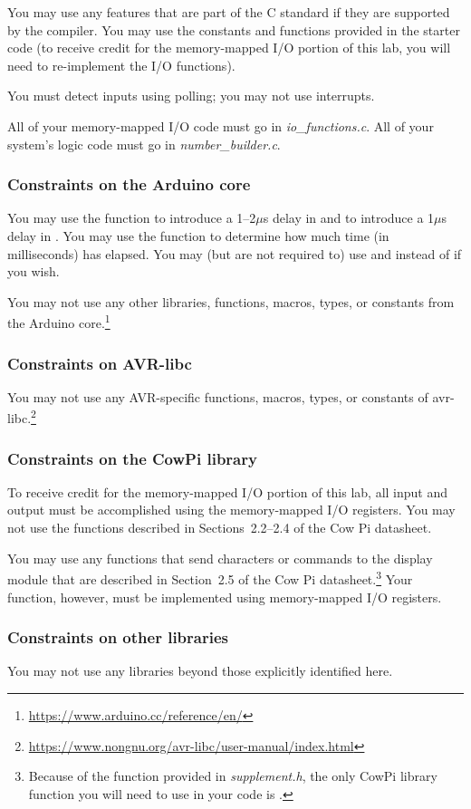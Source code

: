 You may use any features that are part of the C standard if they are supported by the compiler.
You may use the constants and functions provided in the starter code
(to receive credit for the memory-mapped I/O portion of this lab, you will need to re-implement the I/O functions).

You must detect inputs using polling;
you may not use interrupts.

All of your memory-mapped I/O code must go in \textit{io\_functions.c}.
All of your system's logic code must go in \textit{number\_builder.c}.

\subsubsection{Constraints on the Arduino core}

You may use the  function to introduce a 1--2$\mu$s delay in  and to introduce a 1$\mu$s delay in .
You may use the  function to determine how much time (in milliseconds) has elapsed.
You may (but are not required to) use  and  instead of  if you wish.

You may not use any other libraries, functions, macros, types, or constants from the Arduino core.\footnote{\url{https://www.arduino.cc/reference/en/}}

\subsubsection{Constraints on AVR-libc}

You may not use any AVR-specific functions, macros, types, or constants of avr-libc.\footnote{\url{https://www.nongnu.org/avr-libc/user-manual/index.html}}

\subsubsection{Constraints on the CowPi library}

To receive credit for the memory-mapped I/O portion of this lab, all input and
output must be accomplished using the memory-mapped I/O registers.
You may not use the functions described in Sections~2.2--2.4 of the Cow Pi datasheet.

You may use any functions that send characters or commands to the display module that are described in Section~2.5 of the Cow Pi datasheet.\footnote{
    Because of the  function provided in \textit{supplement.h}, the only CowPi library function you will need to use in your code is .
}
Your  function, however, must be implemented using memory-mapped I/O registers.

\subsubsection{Constraints on other libraries}

You may not use any libraries beyond those explicitly identified here.


